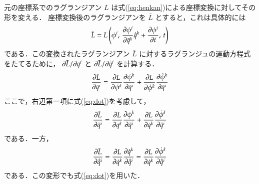             元の座標系でのラグランジアン $L$ は式(\ref{eq:henkan})による座標変換に対してその形を変える．
            座標変換後のラグランジアンを $\bar{L}$ とすると，これは具体的には
                \begin{align}
                    \bar{L}=L\left( \phi^{i},\, \frac{\partial \phi^{i}}{\partial \bar{q}^{k}}\dot{ \bar{q}}^{k}+\frac{\partial \phi^{i}}{\partial t},\,t \right)
                \end{align}
            である．この変換されたラグランジアン $\bar{L}$ に対するラグランジュの運動方程式をたてるために，
            $\partial \bar{L} / \partial \bar{q}^{i}$ と $\partial \bar{L} / \partial \dot{\bar{q}}^{i}$ を計算する．
                \begin{equation*}
                    \frac{\partial \bar{L}}{\partial \bar{q}^{i}} = \frac{\partial L}{\partial \phi^{k}}\frac{\partial \phi^{k}}{\partial \bar{q}^{i}}
                    +\frac{\partial L}{\partial \dot{\phi}^{k}}\frac{\partial \dot{\phi}^{k}}{\partial \bar{q}^{i}}
                \end{equation*}
            ここで，右辺第一項に式(\ref{eq:dot})を考慮して，
                \begin{align}\label{eq:lag1}
                    \frac{\rd \bar{L}}{\rd \bar{q}^{i}}
                        = \frac{\rd L}{\rd q^{k}}\frac{\rd \phi^{k}}{\rd \bar{q}^{i}}
                            +\frac{\rd L}{\rd \dot{q}^{k}}\frac{\rd \dot{\phi}^{k}}{\rd \bar{q}^{i}}
                \end{align}
            である．一方，
                \begin{align}\label{eq:lag2}
                    \frac{\rd \bar{L}}{\rd \dot{\bar{q}}^{i}}
                        =\frac{\rd L}{\rd \dot{q}^{k}}\frac{\rd \dot{q}^{k}}{\rd \dot{\bar{q}}^{i}}
                        =\frac{\rd L}{\rd \dot{q}^{k}}\frac{\rd \dot{\phi}^{k}}{\rd \dot{\bar{q}}^{i}}
                \end{align}
            である．この変形でも式(\ref{eq:dot})を用いた．

